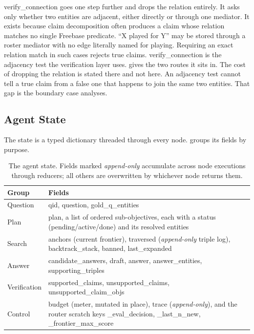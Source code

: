\textsf{verify\_connection} goes one step further and drops the relation
entirely. It asks only whether two entities are adjacent, either directly or
through one mediator. It exists because claim decomposition often produces a
claim whose relation matches no single Freebase predicate. ``X played for Y''
may be stored through a roster mediator with no edge literally named for
playing. Requiring an exact relation match in such cases rejects true claims.
\textsf{verify\_connection} is the adjacency test the verification layer uses.
 gives the two routes it sits in. The cost of
dropping the relation is stated there and not here. An adjacency test cannot
tell a true claim from a false one that happens to join the same two entities.
That gap is the boundary case  analyses.

\subsection{Agent State}\label{sec:state}

The state is a typed dictionary threaded through every node. 
groups its fields by purpose.

\begin{table}[!tb]
  \begin{center}
    \caption[The agent state]{The agent state. Fields marked \emph{append-only}
    accumulate across node executions through reducers; all others are
    overwritten by whichever node returns them.}
    \label{tab:state}
    \footnotesize
    \begin{tabular}{|l|L{88mm}|}
      \hline
      \textbf{Group} & \textbf{Fields} \\
      \hline
      Question & \textsf{qid}, \textsf{question}, \textsf{gold\_q\_entities} \\
      \hline
      Plan & \textsf{plan}, a list of ordered sub-objectives, each with a status
      (\textsf{pending}/\textsf{active}/\textsf{done}) and its resolved entities
      \\
      \hline
      Search & \textsf{anchors} (current frontier), \textsf{traversed}
      (\emph{append-only} triple log), \textsf{backtrack\_stack},
      \textsf{banned}, \textsf{last\_expanded} \\
      \hline
      Answer & \textsf{candidate\_answers}, \textsf{draft}, \textsf{answer},
      \textsf{answer\_entities}, \textsf{supporting\_triples} \\
      \hline
      Verification & \textsf{supported\_claims}, \textsf{unsupported\_claims},
      \textsf{unsupported\_claim\_objs} \\
      \hline
      Control & \textsf{budget} (meter, mutated in place), \textsf{trace}
      (\emph{append-only}), and the router scratch keys
      \textsf{\_eval\_decision}, \textsf{\_last\_n\_new},
      \textsf{\_frontier\_max\_score} \\
      \hline
    \end{tabular}
  \end{center}
\end{table}

